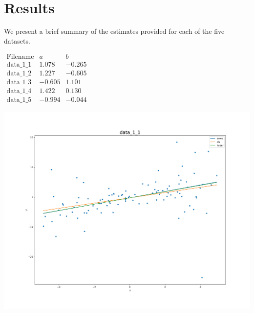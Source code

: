 \documentclass[11pt, a4 paper]{article}
\begin{document}
\newpage
\section{Results}
We present a brief summary of the estimates provided for each of the five datasets.

\begin{minipage}{.5\textwidth}
\begin{center}
$\begin{array}{c|cc}
\mbox{Filename} & a & b \\\hline
\mbox{data\_1\_1} & 1.078 & -0.265 \\
\mbox{data\_1\_2} & 1.227 & -0.605 \\
\mbox{data\_1\_3} & -0.605 & 1.101 \\
\mbox{data\_1\_4} & 1.422 & 0.130 \\
\mbox{data\_1\_5} & -0.994 & -0.044
\end{array}$
\end{center}
\end{minipage}%
\begin{minipage}{.5\textwidth}
\includegraphics[scale=0.25]{data_1_1-figure.png}
\end{minipage}
\end{document}
